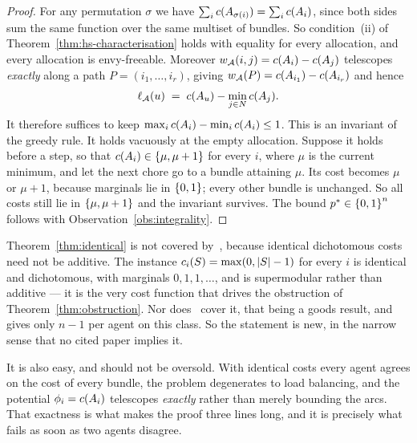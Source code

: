 \begin{proof}
For any permutation $\sigma$ we have $\sum_i c(A_{\sigma(i)}) =
\sum_i c(A_{i})$, since both sides sum the same function over the same
multiset of bundles. So condition~(ii) of Theorem~\ref{thm:hs-characterisation}
holds with equality for every allocation, and every allocation is
envy-freeable. Moreover $w_{\mathcal{A}}(i,j) = c(A_{i}) -
c(A_{j})$ telescopes \emph{exactly} along a path
$P = (i_1,\dots,i_r)$, giving $w_{\mathcal{A}}(P) = c(A_{i_1}) -
c(A_{i_r})$ and hence
\[
  \ell_{\mathcal{A}}(u) \;=\; c(A_{u}) - \min_{j \in N}
  c(A_{j}) .
\]
It therefore suffices to keep $\max_i c(A_{i}) - \min_i
c(A_{i}) \le 1$. This is an invariant of the greedy rule. It holds
vacuously at the empty allocation. Suppose it holds before a step, so that
$c(A_{i}) \in \left\{\mu, \mu+1\right\}$ for every $i$, where $\mu$ is the
current minimum, and let the next chore go to a bundle attaining $\mu$. Its cost
becomes $\mu$ or $\mu + 1$, because marginals lie in $\left\{0,1\right\}$; every other
bundle is unchanged. So all costs still lie in $\left\{\mu,\mu+1\right\}$ and the
invariant survives. The bound $p^{*} \in \left\{0,1\right\}^n$ follows with
Observation~\ref{obs:integrality}.
\end{proof}

\begin{remark}
\label{rem:identical-new}
Theorem~\ref{thm:identical} is not covered by~\cite{LMS26}, because identical
dichotomous costs need not be additive. The instance $c_i(S) =
\max(0,\left\lvert S\right\rvert-1)$ for every $i$ is identical and dichotomous, with marginals
$0,1,1,\dots$, and is supermodular rather than additive --- it is the very cost
function that drives the obstruction of Theorem~\ref{thm:obstruction}. Nor
does~\cite{BKNS22} cover it, that being a goods result, and~\cite{KMSTY24} gives
only $n-1$ per agent on this class. So the statement is new, in the narrow sense
that no cited paper implies it.

It is also easy, and should not be oversold. With identical costs every agent
agrees on the cost of every bundle, the problem degenerates to load balancing,
and the potential $\phi_i = c(A_{i})$ telescopes \emph{exactly} rather
than merely bounding the arcs. That exactness is what makes the proof three
lines long, and it is precisely what fails as soon as two agents disagree.
\end{remark}

